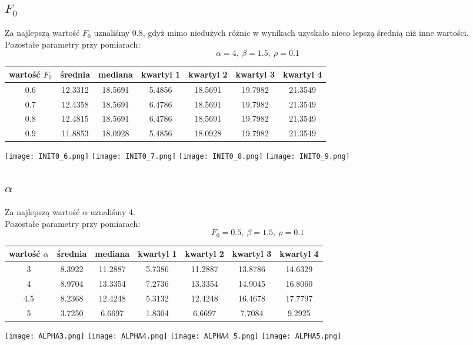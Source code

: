 \documentclass[a4paper]{article}
\begin{document}
\subsection{$F_0$}
Za najlepszą wartość $F_0$ uznaliśmy 0.8, gdyż mimo niedużych różnic w wynikach uzyskało nieco lepszą średnią niż inne wartości.\\
Pozostałe parametry przy pomiarach:
$$\alpha=4, ~ \beta=1.5, ~ \rho=0.1$$
\begin{center}
\begin{tabular}{|c|c|c|c|c|c|c|}
\hline
wartość $F_0$ & średnia & mediana & kwartyl 1 & kwartyl 2 & kwartyl 3 & kwartyl 4 \\
\hline
0.6 & 12.3312 & 18.5691 & 5.4856 & 18.5691 & 19.7982 & 21.3549 \\
\hline
0.7 & 12.4358 & 18.5691 & 6.4786 & 18.5691 & 19.7982 & 21.3549 \\
\hline
0.8 & 12.4815 &	18.5691 & 6.4786 & 18.5691 & 19.7982 & 21.3549 \\
\hline
0.9 & 11.8853 & 18.0928 & 5.4856 & 18.0928 & 19.7982 & 21.3549 \\
\hline
\end{tabular}

\texttt{[image: INIT0\_6.png]}
\texttt{[image: INIT0\_7.png]}
\texttt{[image: INIT0\_8.png]}
\texttt{[image: INIT0\_9.png]}
\end{center}

\subsection{$\alpha$}
Za najlepszą wartość $\alpha$ uznaliśmy 4.\\
Pozostałe parametry przy pomiarach:
$$F_0=0.5, ~ \beta=1.5, ~ \rho=0.1$$
\begin{center}
\begin{tabular}{|c|c|c|c|c|c|c|}
\hline
wartość $\alpha$ & średnia & mediana & kwartyl 1 & kwartyl 2 & kwartyl 3 & kwartyl 4 \\
\hline
3 & 8.3922 & 11.2887 & 5.7386 & 11.2887 & 13.8786 & 14.6329 \\
\hline
4 & 8.9704 & 13.3354 & 7.2736 & 13.3354 & 14.9045 & 16.8060 \\
\hline
4.5 & 8.2368 & 12.4248 & 5.3132 & 12.4248 & 16.4678 & 17.7797 \\
\hline
5 & 3.7250 & 6.6697 & 1.8304 & 6.6697 & 7.7084 & 9.2925 \\
\hline
\end{tabular}

\texttt{[image: ALPHA3.png]}
\texttt{[image: ALPHA4.png]}
\texttt{[image: ALPHA4\_5.png]}
\texttt{[image: ALPHA5.png]}
\end{center}
\end{document}
